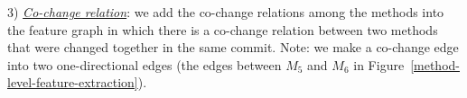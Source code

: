 3) {\em \underline{Co-change relation}}: we add the
co-change relations among the methods into the feature
graph in which there is a co-change relation between two methods that
were changed together in the same commit. Note: we make a co-change
edge into two one-directional edges (the edges between $M_5$ and
$M_6$ in Figure~\ref{method-level-feature-extraction}).



